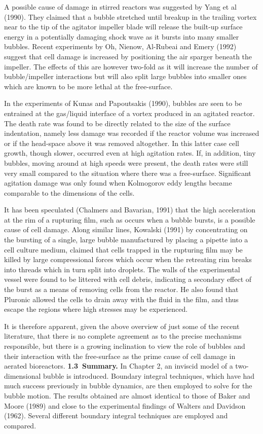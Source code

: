A possible cause of damage in stirred reactors
was suggested by Yang et al (1990). They claimed
that a bubble stretched until breakup in the trailing 
vortex near to the tip of the agitator impeller 
blade will release the built-up surface energy in a 
potentially damaging shock wave as it bursts
into many smaller bubbles. Recent experiments by
Oh, Nienow, Al-Rubeai and Emery (1992) suggest that
cell damage is increased by positioning the air sparger beneath the
impeller. The effects of this are however two-fold as it will 
increase the
number of bubble/impeller interactions but will also split large bubbles
into smaller ones which are known to be more lethal at the free-surface.

In the experiments of Kunas and Papoutsakis (1990),
bubbles are seen to be entrained at the gas/liquid interface of a vortex
produced in an agitated reactor. The death rate was found to be directly
related to the size of the surface indentation, namely less damage was 
recorded if the reactor volume was increased or if the head-space above it was 
removed altogether. In this latter case cell
growth, though slower, occurred even at high agitation rates. If, in addition,
tiny bubbles, moving around at high speeds were present,
the death rates were still very small compared to the situation where there 
was a free-surface. 
Significant agitation damage was only found 
when Kolmogorov eddy lengths became comparable to the dimensions of the cells.

It has been speculated (Chalmers and Bavarian, 1991) that the
high acceleration at the rim of a rupturing film,
such as occurs when a bubble bursts, is a possible cause
of cell damage. Along similar lines, Kowalski (1991) by concentrating on
the bursting of a single, large bubble manufactured by placing a pipette 
into a cell culture medium, claimed that cells trapped in the rupturing
film may be killed by large compressional forces which occur when the 
retreating rim breaks into threads which in turn split into droplets.
The walls of the experimental vessel were found to be littered with cell
debris, indicating a secondary effect of the burst as a means of
removing cells from the reactor. He also found that Pluronic allowed
the cells to drain away with the fluid in the film,
and thus escape the regions where high stresses
may be experienced.

It is therefore apparent, given the above overview of just some of the
recent literature, that there is no complete agreement as to the precise 
mechanisms responsible, but there is a growing inclination to view the role
of
bubbles and their interaction with the free-surface as the prime cause of 
cell damage in aerated bioreactors.
\vskip 15pt
\hbox{\bf 1.3 Summary.}
\vskip 5pt
In Chapter 2, an inviscid model of a two-dimensional bubble
is introduced. Boundary integral techniques, 
which have had much success previously in bubble dynamics, 
are then employed to solve for the
bubble motion. The results obtained are almost identical to those of Baker
and Moore (1989) and close to 
the experimental findings of Walters and Davidson (1962). Several different
boundary integral techniques are employed and compared.


